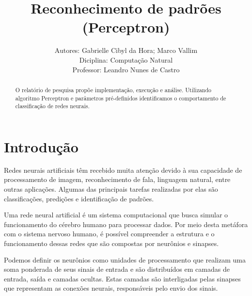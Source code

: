 \documentclass[runningheads]{llncs}
\begin{document}
%
\title{Reconhecimento de padrões (Perceptron)}
%
%
\pagestyle{plain}
\author{Autores: Gabrielle Cibyl da Hora; Marco Vallim \\ 
Diciplina: Computação Natural \\
Professor: Leandro Nunes de Castro} 
%
%
%
\maketitle              %
%
\begin{abstract}
O relatório de pesquisa propõe implementação, execução e análise. Utilizando algoritmo Perceptron e parâmetros pré-definidos identificamos o comportamento de classificação de redes neurais.

\end{abstract}
%
%
\section{Introdução}

Redes neurais artificiais têm recebido muita atenção devido à sua capacidade de processamento de imagem, reconhecimento de fala, linguagem natural, entre outras aplicações. Algumas das principais tarefas realizadas por elas são classificações, predições e identificação de padrões. \cite{Cao17} 

Uma rede neural artificial é um sistema computacional que busca simular o funcionamento do cérebro humano para processar dados. Por meio desta metáfora com o sistema nervoso humano, é possível compreender a estrutura e o funcionamento dessas redes que são compostas por neurônios e sinapses. \cite{Cao17}

Podemos definir os neurônios como unidades de processamento que realizam uma soma ponderada de seus sinais de entrada e são distribuídos em camadas de entrada, saída e camadas ocultas. Estas camadas são interligadas pelas sinapses que representam as conexões neurais, responsáveis pelo envio dos sinais. \cite{Cao17} \cite{M} 
\end{document}
